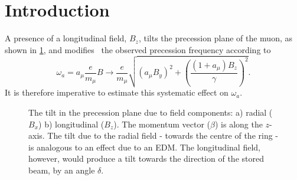 \documentclass[12pt]{article}
\begin{document}
\section{Introduction}
A presence of a longitudinal field, $B_z$, tilts the precession plane of the muon, as shown in \cref{fig:mf_tilt}, and modifies~\cite{Bill} the observed precession frequency according to 
\begin{equation}
  \omega_a= a_{\mu}\frac{e}{m_{\mu}}B \rightarrow \frac{e}{m_{\mu}}  \sqrt{ (a_{\mu}B_y)^2 + \left(\frac{(1+a_{\mu})B_z}{\gamma}\right)^2 }.
\end{equation}
It is therefore imperative to estimate this systematic effect on $\omega_a$.
\vspace{-0.2cm}
\begin{figure}[htpb]
    \centering
    \vspace{-0.2cm}
    \caption{The tilt in the precession plane due to field components: a) radial ($B_x$) b) longitudinal ($B_z$). The momentum vector ($\beta$) is along the $z$-axis. The tilt due to the radial field - towards the centre of the ring - is analogous to an effect due to an EDM. The longitudinal field, however, would produce a tilt towards the direction of the stored beam, by an angle $\delta$.}
    \label{fig:mf_tilt}
\end{figure}
\end{document}
